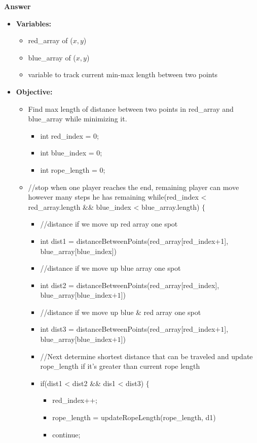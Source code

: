 \documentclass{article}
\begin{document}
\textbf{ Answer }
\begin{itemize}
\item {\bf Variables: }
\begin{itemize}
\item red\_array of ($x,y$)
\item blue\_array of ($x,y$)
\item variable to track current min-max length between two points
\end{itemize}
\item {\bf Objective: }
\begin{itemize}
\item Find max length of distance between two points in red\_array and blue\_array while minimizing it.
\begin{itemize}
\item int red\_index = 0;
\item int blue\_index = 0;
\item int rope\_length = 0;
\end{itemize}
\item //stop when one player reaches the end, remaining player can move however many steps he has remaining
while(red\_index < red\_array.length \&\& blue\_index < blue\_array.length) $\{$
\begin{itemize}
\item //distance if we move up red array one spot
\item int dist1 = distanceBetweenPoints(red\_array[red\_index+1], blue\_array[blue\_index])
\item //distance if we move up blue array one spot
\item int dist2 = distanceBetweenPoints(red\_array[red\_index], blue\_array[blue\_index$+1$])
\item //distance if we move up blue \& red array one spot
\item int dist3 = distanceBetweenPoints(red\_array[red\_index$+1$], blue\_array[blue\_index$+1$])
\item //Next determine shortest distance that can be traveled and update rope\_length if it's greater than current rope length
\item if(dist1 < dist2 \&\& dis1 < dist3) $\{$
\begin{itemize}
\item red\_index++;
\item rope\_length = updateRopeLength(rope\_length, d1)
\item continue;
\end{itemize}

\end{itemize}
\end{itemize}
\end{itemize}
\end{document}
